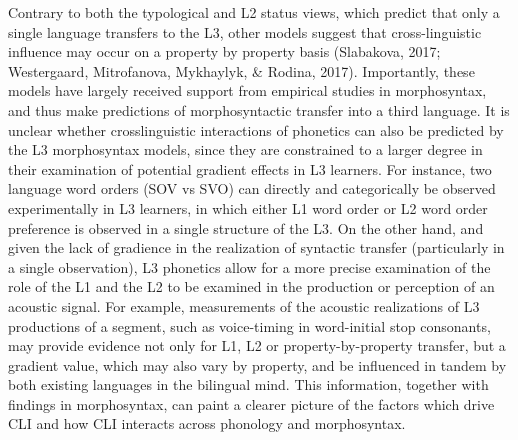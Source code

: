 \documentclass[
  english,
  man]{apa6}
\begin{document}
Contrary to both the typological and L2 status views, which predict that only a single language transfers to the L3, other models suggest that cross-linguistic influence may occur on a property by property basis (Slabakova, 2017; Westergaard, Mitrofanova, Mykhaylyk, \& Rodina, 2017).
Importantly, these models have largely received support from empirical studies in morphosyntax, and thus make predictions of morphosyntactic transfer into a third language.
It is unclear whether crosslinguistic interactions of phonetics can also be predicted by the L3 morphosyntax models, since they are constrained to a larger degree in their examination of potential gradient effects in L3 learners.
For instance, two language word orders (SOV vs SVO) can directly and categorically be observed experimentally in L3 learners, in which either L1 word order or L2 word order preference is observed in a single structure of the L3.
On the other hand, and given the lack of gradience in the realization of syntactic transfer (particularly in a single observation), L3 phonetics allow for a more precise examination of the role of the L1 and the L2 to be examined in the production or perception of an acoustic signal.
For example, measurements of the acoustic realizations of L3 productions of a segment, such as voice-timing in word-initial stop consonants, may provide evidence not only for L1, L2 or property-by-property transfer, but a gradient value, which may also vary by property, and be influenced in tandem by both existing languages in the bilingual mind.
This information, together with findings in morphosyntax, can paint a clearer picture of the factors which drive CLI and how CLI interacts across phonology and morphosyntax.
\end{document}

